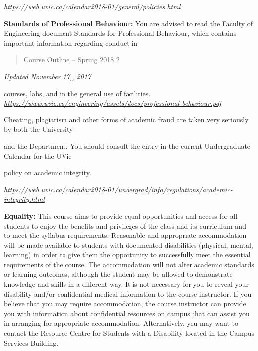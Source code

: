 \href{https://web.uvic.ca/calendar2018-01/general/policies.html}{\emph{https://web.uvic.ca/calendar2018-01/general/policies.html}}

\textbf{Standards of Professional Behaviour:} You are advised to read
the Faculty of Engineering document Standards for Professional
Behaviour, which contains important information regarding conduct in

\begin{quote}
Course Outline -- Spring 2018 2
\end{quote}

\emph{Updated November 17,, 2017}

courses, labs, and in the general use of facilities.
\href{https://www.uvic.ca/engineering/assets/docs/professional-behaviour.pdf}{\emph{https://www.uvic.ca/engineering/assets/docs/professional-behaviour.pdf}}

Cheating, plagiarism and other forms of academic fraud are taken very
seriously by both the University

and the Department. You should consult the entry in the current
Undergraduate Calendar for the UVic

policy on academic integrity.

\href{https://web.uvic.ca/calendar2018-01/undergrad/info/regulations/academic-integrity.html}{\emph{https://web.uvic.ca/calendar2018-01/undergrad/info/regulations/academic-integrity.html}}

\textbf{Equality:} This course aims to provide equal opportunities and
access for all students to enjoy the benefits and privileges of the
class and its curriculum and to meet the syllabus requirements.
Reasonable and appropriate accommodation will be made available to
students with documented disabilities (physical, mental, learning) in
order to give them the opportunity to successfully meet the essential
requirements of the course. The accommodation will not alter academic
standards or learning outcomes, although the student may be allowed to
demonstrate knowledge and skills in a different way. It is not necessary
for you to reveal your disability and/or confidential medical
information to the course instructor. If you believe that you may
require accommodation, the course instructor can provide you with
information about confidential resources on campus that can assist you
in arranging for appropriate accommodation. Alternatively, you may want
to contact the Resource Centre for Students with a Disability located in
the Campus Services Building.

